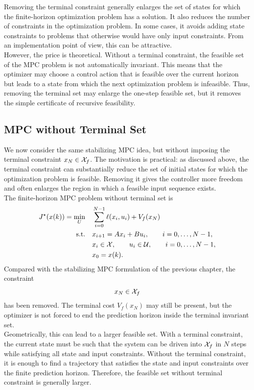 Removing the terminal constraint generally enlarges the set of states for which the finite-horizon
optimization problem has a solution. It also reduces the number of constraints in the optimization
problem. In some cases, it avoids adding state constraints to problems that otherwise would have
only input constraints. From an implementation point of view, this can be attractive.\\
However, the price is theoretical. Without a terminal constraint, the feasible set of the MPC
problem is not automatically invariant. This means that the optimizer may choose a control
action that is feasible over the current horizon but leads to a state from which the next
optimization problem is infeasible. Thus, removing the terminal set may enlarge the one-step
feasible set, but it removes the simple certificate of recursive feasibility.

\subsection{MPC without Terminal Set}

We now consider the same stabilizing MPC idea, but without imposing the terminal constraint
\(x_N\in\mathcal{X}_f\). The motivation is practical: as discussed above, the terminal constraint can
substantially reduce the set of initial states for which the optimization problem is feasible.
Removing it gives the controller more freedom and often enlarges the region in which a feasible
input sequence exists.\\
The finite-horizon MPC problem without terminal set is
\[
\begin{aligned}
    J^\star(x(k))=\min_U \quad &
    \sum_{i=0}^{N-1}\ell(x_i,u_i)+V_f(x_N)\\
    \text{s.t.}\quad &
    x_{i+1}=Ax_i+Bu_i,\qquad i=0,\dots,N-1,\\
    & x_i\in\mathcal{X},\qquad u_i\in\mathcal{U},\qquad i=0,\dots,N-1,\\
    & x_0=x(k).
\end{aligned}
\]
Compared with the stabilizing MPC formulation of the previous chapter, the constraint
\[
    x_N\in\mathcal{X}_f
\]
has been removed. The terminal cost \(V_f(x_N)\) may still be present, but the optimizer is not
forced to end the prediction horizon inside the terminal invariant set.\\
Geometrically, this can lead to a larger feasible set. With a terminal constraint, the current
state must be such that the system can be driven into \(\mathcal{X}_f\) in \(N\) steps while satisfying all
state and input constraints. Without the terminal constraint, it is enough to find a trajectory
that satisfies the state and input constraints over the finite prediction horizon. Therefore, the
feasible set without terminal constraint is generally larger.

